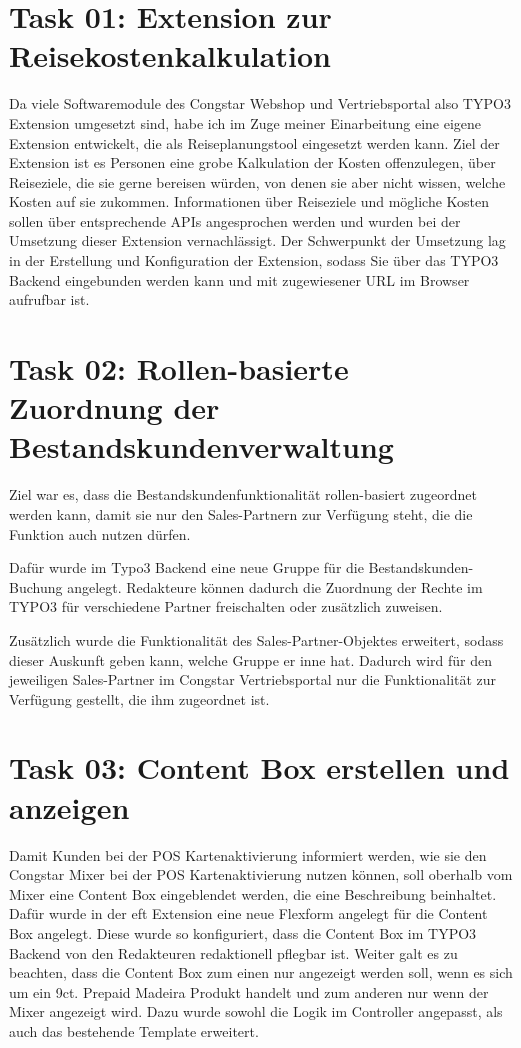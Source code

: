 \documentclass[11pt,a4paper]{article}
\begin{document}
\section{Task 01: Extension zur Reisekostenkalkulation} \label{sec:pipeline}

Da viele Softwaremodule des Congstar Webshop und Vertriebsportal also TYPO3 Extension umgesetzt sind, habe ich im Zuge 
meiner Einarbeitung eine eigene Extension entwickelt, die als Reiseplanungstool eingesetzt werden kann.
Ziel der Extension ist es Personen eine grobe Kalkulation der Kosten offenzulegen, über Reiseziele, 
die sie gerne bereisen würden, von denen sie aber nicht wissen, welche Kosten auf sie zukommen. 
Informationen über Reiseziele und mögliche Kosten sollen über entsprechende APIs angesprochen werden und wurden bei der Umsetzung dieser Extension vernachlässigt.
Der Schwerpunkt der Umsetzung lag in der Erstellung und Konfiguration der Extension, sodass Sie über das
TYPO3 Backend eingebunden werden kann und mit zugewiesener URL im Browser aufrufbar ist.




\section{Task 02: Rollen-basierte Zuordnung der Bestandskundenverwaltung} \label{sec:t02}

Ziel war es, dass die Bestandskundenfunktionalität rollen-basiert zugeordnet werden kann, 
damit sie nur den Sales-Partnern zur Verfügung steht, die die Funktion auch nutzen dürfen.

Dafür wurde im Typo3 Backend eine neue Gruppe für die Bestandskunden-Buchung angelegt.
Redakteure können dadurch die Zuordnung der Rechte im TYPO3 für verschiedene Partner freischalten
oder zusätzlich zuweisen.

Zusätzlich wurde die Funktionalität des Sales-Partner-Objektes erweitert, sodass dieser Auskunft geben kann, 
welche Gruppe er inne hat. Dadurch wird für den jeweiligen Sales-Partner im Congstar Vertriebsportal
nur die Funktionalität zur Verfügung gestellt, die ihm zugeordnet ist.




\section{Task 03: Content Box erstellen und anzeigen}

Damit Kunden bei der POS Kartenaktivierung informiert werden, wie sie den Congstar Mixer bei der POS Kartenaktivierung
nutzen können, soll oberhalb vom Mixer eine Content Box eingeblendet werden, die eine Beschreibung beinhaltet.
Dafür wurde in der eft Extension eine neue Flexform angelegt für die Content Box angelegt.
Diese wurde so konfiguriert, dass die Content Box im TYPO3 Backend von den Redakteuren redaktionell pflegbar ist.
Weiter galt es zu beachten, dass die Content Box zum einen nur angezeigt werden soll,
wenn es sich um ein 9ct. Prepaid Madeira Produkt handelt und zum anderen nur wenn der Mixer angezeigt wird.
Dazu wurde sowohl die Logik im Controller angepasst, als auch das bestehende Template erweitert.
\end{document}
